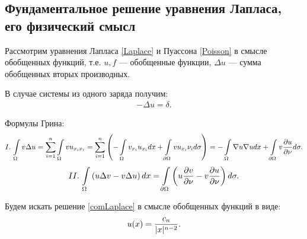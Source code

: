 \subsection{Фундаментальное решение уравнения Лапласа, его физический смысл}
Рассмотрим уравнения Лапласа \eqref{Laplace} и Пуассона \eqref{Poisson} в смысле обобщенных функций, т.е. $u, f$ --- обобщенные функции, $\Delta u$ --- сумма обобщенных вторых производных.

В случае системы из одного заряда получим: \begin{align}-\Delta u = \delta.\label{comLaplace}\end{align}

\begin{note}
Формулы Грина:
$$\MakeUppercase{\romannumeral1}.\, \int\limits_\Omega v\Delta u = \sum\limits_{i = 1}^{n}\int\limits_\Omega vu_{x_i x_i} = \sum\limits_{i = 1}^{n}\left(-\int\limits_\Omega v_{x_i}u_{x_i}dx + \int\limits_{\partial\Omega}vu_{x_i}\nu_i d\sigma\right)=-\int\limits_\Omega\nabla u \nabla u dx + \int\limits_{\partial\Omega}v \dfrac{\partial u}{\partial \nu}d\sigma.$$
$$\MakeUppercase{\romannumeral2}.\, \int\limits_{\Omega}\left(u\Delta v - v\Delta u\right)dx = \int\limits_{\partial\Omega}\left(u\dfrac{\partial v}{\partial \nu} - v\dfrac{\partial u}{\partial \nu}\right)d\sigma.$$
\end{note}

Будем искать решение \eqref{comLaplace} в смысле обобщенных функций в виде:
$$u(x) = \dfrac{c_n}{\lvert x\rvert^{n-2}}.$$

